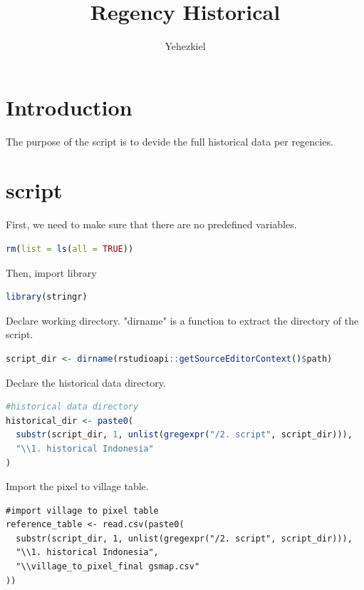 \documentclass[12pt, a4paper]{article}
\title{\textbf{\huge Regency Historical}}
\author{\huge Yehezkiel}
\begin{document}
\maketitle
\thispagestyle{empty}


\newpage


\section{Introduction}
The purpose of the script is to devide the full historical data per regencies.


\section{script}
First, we need to make sure that there are no predefined variables.
\begin{lstlisting}[language=R]
 rm(list = ls(all = TRUE))
\end{lstlisting}

\vskip 0.5cm
\noindent
Then, import library
\begin{lstlisting}[language=R]
 library(stringr)
\end{lstlisting}

\vskip 0.5cm
\noindent
Declare working directory. "dirname" is a function to extract the directory of the script.
\begin{lstlisting}[language=R]
script_dir <- dirname(rstudioapi::getSourceEditorContext()$path)
\end{lstlisting}

\vskip 0.5cm
\noindent
Declare the historical data directory.
\begin{lstlisting}[language=R]
#historical data directory
historical_dir <- paste0(
  substr(script_dir, 1, unlist(gregexpr("/2. script", script_dir))),
  "\\1. historical Indonesia"
)
\end{lstlisting}

\vskip 0.5cm
\noindent
Import the pixel to village table.
\begin{lstlisting}
#import village to pixel table
reference_table <- read.csv(paste0(
  substr(script_dir, 1, unlist(gregexpr("/2. script", script_dir))),
  "\\1. historical Indonesia",
  "\\village_to_pixel_final gsmap.csv"
))
\end{lstlisting}
\end{document}
